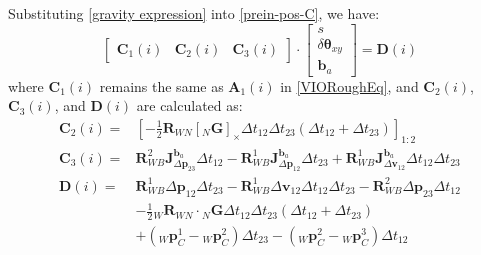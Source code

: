 \documentclass[journal,article,submit,moreauthors,pdftex]{Definitions/mdpi}
\begin{document}
Substituting \ref{gravity expression} into \ref{prein-pos-C}, we have:
\begin{equation}
	\left[\begin{matrix} \boldsymbol{C}_1(i) & \boldsymbol{C}_2(i) & \boldsymbol{C}_3(i) \end{matrix}\right] \cdot  \left[\begin{matrix} s \\ \delta\boldsymbol{\theta}_{xy} \\ \boldsymbol{b}_a \end{matrix}\right] = \boldsymbol{D}(i)
	\label{VIORefine}
\end{equation}
where $\boldsymbol{C}_1(i)$ remains the same as $\boldsymbol{A}_1(i)$ in \ref{VIORoughEq}, and 
$\boldsymbol{C}_2(i)$,$\boldsymbol{C}_3(i)$, and $\boldsymbol{D}(i)$ are 
calculated as:
\begin{equation}
	\begin{aligned}
		\boldsymbol{C}_2(i) = & \left[ -\frac{1}{2} \boldsymbol{R}_{WN} [{ _N\boldsymbol{G}} ]_{\times} \Delta{t_{12}}\Delta{t_{23}}(\Delta{t_{12}} + \Delta{t_{23}}) \right]_{1:2}                                                                                                                                                                    \\
		\boldsymbol{C}_3(i) = & \boldsymbol{R}_{WB}^2\boldsymbol{J}_{\Delta\boldsymbol{p}_{23}}^{\boldsymbol{b}_a} \Delta{t}_{12}-\boldsymbol{R}_{WB}^1 \boldsymbol{J}_{\Delta\boldsymbol{p}_{12}}^{\boldsymbol{b}_a} \Delta{t}_{23} + \boldsymbol{R}_{WB}^1\boldsymbol{J}_{\Delta\boldsymbol{v}_{12}}^{\boldsymbol{b}_a} \Delta{t}_{12}\Delta{t}_{23} \\
		\boldsymbol{D}(i) =   & \boldsymbol{R}_{WB}^1\Delta\boldsymbol{p}_{12}\Delta{t}_{23} -\boldsymbol{R}_{WB}^1\Delta\boldsymbol{v}_{12}\Delta{t}_{12}\Delta{t}_{23} - \boldsymbol{R}_{WB}^2\Delta\boldsymbol{p}_{23}\Delta{t}_{12}                                                                                                                \\
		                      & -\frac{1}{2}{_W}\boldsymbol{R}_{WN}\cdot { _N\boldsymbol{G}}  \Delta{t_{12}}\Delta{t_{23}}(\Delta{t_{12}} + \Delta{t_{23}})                                                                                                                                                                                            \\
		                      & +({_W}\boldsymbol{p}_C^1-{_W}\boldsymbol{p}_C^2)\Delta{t}_{23}-({_W}\boldsymbol{p}_C^2-{_W}\boldsymbol{p}_C^3)\Delta{t}_{12}                                                                                                                                                                                           
	\end{aligned}
\end{equation}
\end{document}
